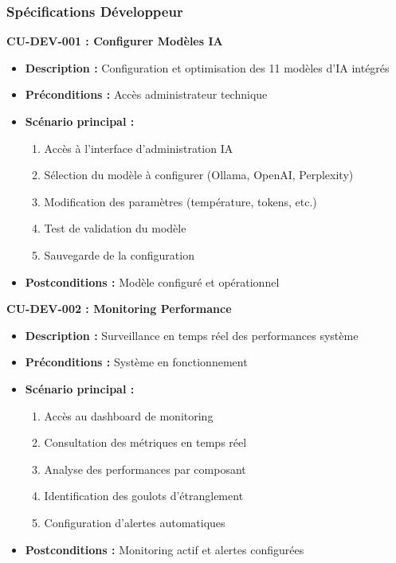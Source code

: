 \subsubsection{Spécifications Développeur}

\textbf{CU-DEV-001 : Configurer Modèles IA}
\begin{itemize}
    \item \textbf{Description :} Configuration et optimisation des 11 modèles d'IA intégrés
    \item \textbf{Préconditions :} Accès administrateur technique
    \item \textbf{Scénario principal :}
    \begin{enumerate}
        \item Accès à l'interface d'administration IA
        \item Sélection du modèle à configurer (Ollama, OpenAI, Perplexity)
        \item Modification des paramètres (température, tokens, etc.)
        \item Test de validation du modèle
        \item Sauvegarde de la configuration
    \end{enumerate}
    \item \textbf{Postconditions :} Modèle configuré et opérationnel
\end{itemize}

\textbf{CU-DEV-002 : Monitoring Performance}
\begin{itemize}
    \item \textbf{Description :} Surveillance en temps réel des performances système
    \item \textbf{Préconditions :} Système en fonctionnement
    \item \textbf{Scénario principal :}
    \begin{enumerate}
        \item Accès au dashboard de monitoring
        \item Consultation des métriques en temps réel
        \item Analyse des performances par composant
        \item Identification des goulots d'étranglement
        \item Configuration d'alertes automatiques
    \end{enumerate}
    \item \textbf{Postconditions :} Monitoring actif et alertes configurées
\end{itemize}

